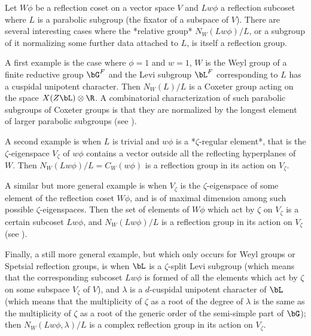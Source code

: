 

Let  $W\phi$ be  a reflection  coset on  a vector  space $V$ and $Lw\phi$ a
reflection  subcoset where  $L$ is  a parabolic  subgroup (the fixator of a
subspace  of $V$). There are several  interesting cases where the *relative
group*  $N_W(Lw\phi)/L$, or a subgroup of  it normalizing some further data
attached to $L$, is itself a reflection group.

A first example is the case where $\phi=1$ and $w=1$, $W$ is the Weyl group
of  a  finite  reductive  group  $\bG^F$  and  the  Levi  subgroup  $\bL^F$
corresponding to $L$ has a cuspidal unipotent character. Then $N_W(L)/L$ is
a  Coxeter group acting  on the space  $X(Z\bL)\otimes\R$. A combinatorial
characterization of such parabolic subgroups of Coxeter groups is that they
are  normalized by the  longest element of  larger parabolic subgroups (see
\cite[5.7.1]{Lus76}).

A  second example is when $L$ is  trivial and $w\phi$ is a *$\zeta$-regular
element*,  that is the  $\zeta$-eigenspace $V_\zeta$ of  $w\phi$ contains a
vector outside all the reflecting hyperplanes of $W$. Then
$N_W(Lw\phi)/L=C_W(w\phi)$   is  a  reflection  group   in  its  action  on
$V_\zeta$.

A similar but more general example is when $V_\zeta$ is the
$\zeta$-eigenspace  of some element of the reflection coset $W\phi$, and is
of  maximal dimension among such possible $\zeta$-eigenspaces. Then the set
of  elements of  $W\phi$ which  act by  $\zeta$ on  $V_\zeta$ is  a certain
subcoset  $Lw\phi$, and $N_W(Lw\phi)/L$ is a reflection group in its action
on $V_\zeta$ (see \cite[2.5]{LS99}).

Finally,  a  still  more  general  example,  but which only occurs for Weyl
groups or Spetsial reflection groups, is when $\bL$ is a $\zeta$-split Levi
subgroup (which means that the corresponding subcoset $Lw\phi$ is formed of
all  the elements which act by $\zeta$  on some subspace $V_\zeta$ of $V$),
and  $\lambda$ is a $d$-cuspidal unipotent  character of $\bL$ (which means
that  the multiplicity of $\zeta$  as a root of  the degree of $\lambda$ is
the  same as the multiplicity of $\zeta$ as  a root of the generic order of
the  semi-simple part of $\bG$);  then $N_W(Lw\phi,\lambda)/L$ is a complex
reflection group in its action on $V_\zeta$.

